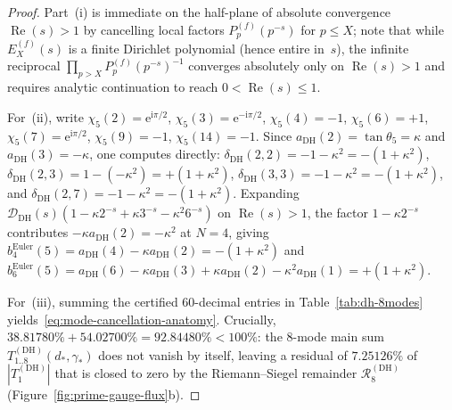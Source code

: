 \documentclass[11pt,reqno]{amsart}
\theoremstyle{definition}
\theoremstyle{remark}
\numberwithin{equation}{section}
\newcommand{\ii}{\mathrm{i}}
\newcommand{\ee}{\mathrm{e}}
\DeclareMathOperator{\Reop}{Re}
\begin{document}
\begin{proof}
Part~(i) is immediate on the half-plane of absolute convergence $\Reop(s) > 1$ by cancelling local factors $P_p^{(f)}(p^{-s})$ for $p \le X$; note that while $E_X^{(f)}(s)$ is a finite Dirichlet polynomial (hence entire in~$s$), the infinite reciprocal $\prod_{p>X} P_p^{(f)}(p^{-s})^{-1}$ converges absolutely only on $\Reop(s) > 1$ and requires analytic continuation to reach $0 < \Reop(s) \le 1$.

For~(ii), write $\chi_5(2) = \ee^{\ii\pi/2}$, $\chi_5(3) = \ee^{-\ii\pi/2}$, $\chi_5(4) = -1$, $\chi_5(6) = +1$, $\chi_5(7) = \ee^{\ii\pi/2}$, $\chi_5(9) = -1$, $\chi_5(14) = -1$. Since $a_{\mathrm{DH}}(2) = \tan\theta_5 = \kappa$ and $a_{\mathrm{DH}}(3) = -\kappa$, one computes directly: $\delta_{\mathrm{DH}}(2,2) = -1 - \kappa^2 = -(1+\kappa^2)$, $\delta_{\mathrm{DH}}(2,3) = 1 - (-\kappa^2) = +(1+\kappa^2)$, $\delta_{\mathrm{DH}}(3,3) = -1 - \kappa^2 = -(1+\kappa^2)$, and $\delta_{\mathrm{DH}}(2,7) = -1 - \kappa^2 = -(1+\kappa^2)$. Expanding $\mathcal{D}_{\mathrm{DH}}(s)(1 - \kappa 2^{-s} + \kappa 3^{-s} - \kappa^2 6^{-s})$ on $\Reop(s) > 1$, the factor $1 - \kappa 2^{-s}$ contributes $-\kappa a_{\mathrm{DH}}(2) = -\kappa^2$ at $N=4$, giving $b_4^{\mathrm{Euler}}(5) = a_{\mathrm{DH}}(4) - \kappa a_{\mathrm{DH}}(2) = -(1+\kappa^2)$ and $b_6^{\mathrm{Euler}}(5) = a_{\mathrm{DH}}(6) - \kappa a_{\mathrm{DH}}(3) + \kappa a_{\mathrm{DH}}(2) - \kappa^2 a_{\mathrm{DH}}(1) = +(1+\kappa^2)$.

For~(iii), summing the certified 60-decimal entries in Table~\ref{tab:dh-8modes} yields~\eqref{eq:mode-cancellation-anatomy}. Crucially, $38.81780\% + 54.02700\% = 92.84480\% < 100\%$: the 8-mode main sum $T_{1..8}^{(\mathrm{DH})}(d_*,\gamma_*)$ does not vanish by itself, leaving a residual of $7.25126\%$ of $|T_1^{(\mathrm{DH})}|$ that is closed to zero by the Riemann--Siegel remainder $\mathcal{R}_8^{(\mathrm{DH})}$ (Figure~\ref{fig:prime-gauge-flux}b).
\end{proof}
\end{document}
